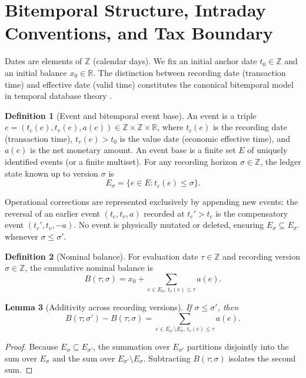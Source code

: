 \documentclass[11pt, a4paper]{article}
\theoremstyle{definition}
\newtheorem{definicao}{Definition}[section]
\theoremstyle{plain}
\newtheorem{lema}[definicao]{Lemma}
\theoremstyle{remark}
\begin{document}
\section{Bitemporal Structure, Intraday Conventions, and Tax Boundary}\label{sec:1}

Dates are elements of $\mathbb{Z}$ (calendar days). We fix an initial anchor date $t_0 \in \mathbb{Z}$ and an initial balance $x_0 \in \mathbb{R}$. The distinction between recording date (transaction time) and effective date (valid time) constitutes the canonical bitemporal model in temporal database theory \cite{Snodgrass1999, JensenSnodgrass1999, Date2014, Kulkarni2012, Fowler2021}.

\begin{definicao}[Event and bitemporal event base]\label{def:1.1}
An event is a triple $e = (t_c(e), t_v(e), a(e)) \in \mathbb{Z} \times \mathbb{Z} \times \mathbb{R}$, where $t_c(e)$ is the recording date (transaction time), $t_v(e) > t_0$ is the value date (economic effective time), and $a(e)$ is the net monetary amount. An event base is a finite set $E$ of uniquely identified events (or a finite multiset). For any recording horizon $\sigma \in \mathbb{Z}$, the ledger state known up to version $\sigma$ is
\[
E_\sigma = \{e \in E : t_c(e) \le \sigma\}.
\]
\end{definicao}

Operational corrections are represented exclusively by appending new events: the reversal of an earlier event $(t_c, t_v, a)$ recorded at $t_c' > t_c$ is the compensatory event $(t_c', t_v, -a)$. No event is physically mutated or deleted, ensuring $E_\sigma \subseteq E_{\sigma'}$ whenever $\sigma \le \sigma'$.

\begin{definicao}[Nominal balance]\label{def:1.2}
For evaluation date $\tau \in \mathbb{Z}$ and recording version $\sigma \in \mathbb{Z}$, the cumulative nominal balance is
\[
B(\tau; \sigma) = x_0 + \sum_{e \in E_\sigma,\, t_v(e) \le \tau} a(e).
\]
\end{definicao}

\begin{lema}[Additivity across recording versions]\label{lem:1.3}
If $\sigma \le \sigma'$, then
\[
B(\tau; \sigma') - B(\tau; \sigma) = \sum_{e \in E_{\sigma'} \setminus E_\sigma,\, t_v(e) \le \tau} a(e).
\]
\end{lema}
\begin{proof}
Because $E_\sigma \subseteq E_{\sigma'}$, the summation over $E_{\sigma'}$ partitions disjointly into the sum over $E_\sigma$ and the sum over $E_{\sigma'} \setminus E_\sigma$. Subtracting $B(\tau; \sigma)$ isolates the second sum.
\end{proof}
\end{document}
